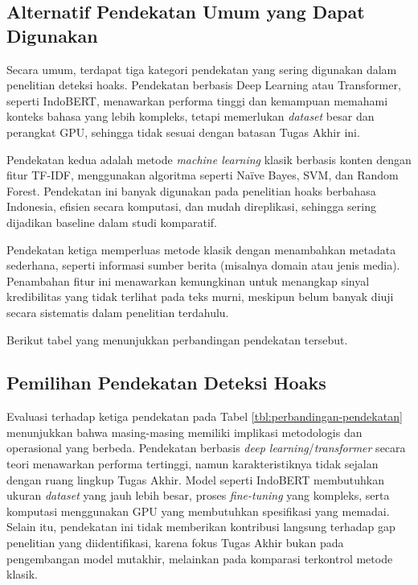 \subsection{Alternatif Pendekatan Umum yang Dapat Digunakan}

Secara umum, terdapat tiga kategori pendekatan yang sering digunakan dalam penelitian deteksi hoaks. Pendekatan berbasis Deep Learning atau Transformer, seperti IndoBERT, menawarkan performa tinggi dan kemampuan memahami konteks bahasa yang lebih kompleks, tetapi memerlukan \textit{dataset} besar dan perangkat GPU, sehingga tidak sesuai dengan batasan Tugas Akhir ini.

Pendekatan kedua adalah metode \textit{machine learning} klasik berbasis konten dengan fitur TF-IDF, menggunakan algoritma seperti Naïve Bayes, SVM, dan Random Forest. Pendekatan ini banyak digunakan pada penelitian hoaks berbahasa Indonesia, efisien secara komputasi, dan mudah direplikasi, sehingga sering dijadikan baseline dalam studi komparatif.

Pendekatan ketiga memperluas metode klasik dengan menambahkan metadata sederhana, seperti informasi sumber berita (misalnya domain atau jenis media). Penambahan fitur ini menawarkan kemungkinan untuk menangkap sinyal kredibilitas yang tidak terlihat pada teks murni, meskipun belum banyak diuji secara sistematis dalam penelitian terdahulu.

Berikut tabel yang menunjukkan perbandingan pendekatan tersebut.



\subsection{Pemilihan Pendekatan Deteksi Hoaks}

Evaluasi terhadap ketiga pendekatan pada Tabel \ref{tbl:perbandingan-pendekatan} menunjukkan bahwa masing-masing memiliki implikasi metodologis dan operasional yang berbeda. Pendekatan berbasis \textit{deep learning}/\textit{transformer} secara teori menawarkan performa tertinggi, namun karakteristiknya tidak sejalan dengan ruang lingkup Tugas Akhir. Model seperti IndoBERT membutuhkan ukuran \textit{dataset} yang jauh lebih besar, proses \textit{fine-tuning} yang kompleks, serta komputasi menggunakan GPU yang membutuhkan spesifikasi yang memadai. Selain itu, pendekatan ini tidak memberikan kontribusi langsung terhadap gap penelitian yang diidentifikasi, karena fokus Tugas Akhir bukan pada pengembangan model mutakhir, melainkan pada komparasi terkontrol metode klasik.

